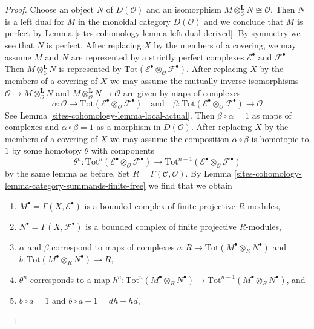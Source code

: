 \begin{proof}
\medskip\noindent
Choose an object $N$ of $D(\mathcal{O})$ and an isomorphism
$M \otimes_\mathcal{O}^\mathbf{L} N \cong \mathcal{O}$.
Then $N$ is a left dual for $M$ in the monoidal category
$D(\mathcal{O})$ and we conclude that $M$ is perfect by
Lemma \ref{sites-cohomology-lemma-left-dual-derived}. By symmetry we see that
$N$ is perfect. After replacing $X$ by the members of a covering,
we may assume $M$ and $N$ are represented by a strictly perfect
complexes $\mathcal{E}^\bullet$ and $\mathcal{F}^\bullet$.
Then $M \otimes_\mathcal{O}^\mathbf{L} N$ is represented by
$\text{Tot}(\mathcal{E}^\bullet \otimes_\mathcal{O} \mathcal{F}^\bullet)$.
After replacing $X$ by the members of a covering of $X$
we may assume the mutually inverse isomorphisms
$\mathcal{O} \to M \otimes_\mathcal{O}^\mathbf{L} N$ and
$M \otimes_\mathcal{O}^\mathbf{L} N \to \mathcal{O}$
are given by maps of complexes
$$
\alpha : \mathcal{O} \to
\text{Tot}(\mathcal{E}^\bullet \otimes_\mathcal{O} \mathcal{F}^\bullet)
\quad\text{and}\quad
\beta :
\text{Tot}(\mathcal{E}^\bullet \otimes_\mathcal{O} \mathcal{F}^\bullet)
\to \mathcal{O}
$$
See Lemma \ref{sites-cohomology-lemma-local-actual}. Then $\beta \circ \alpha = 1$
as maps of complexes and $\alpha \circ \beta = 1$ as a morphism
in $D(\mathcal{O})$. After replacing $X$ by the members of a covering
of $X$ we may assume the composition $\alpha \circ \beta$ is homotopic to $1$
by some homotopy $\theta$ with components
$$
\theta^n :
\text{Tot}^n(\mathcal{E}^\bullet \otimes_\mathcal{O} \mathcal{F}^\bullet)
\to
\text{Tot}^{n - 1}(
\mathcal{E}^\bullet \otimes_\mathcal{O} \mathcal{F}^\bullet)
$$
by the same lemma as before. Set $R = \Gamma(\mathcal{C}, \mathcal{O})$. By
Lemma \ref{sites-cohomology-lemma-category-summands-finite-free}
we find that we obtain
\begin{enumerate}
\item $M^\bullet = \Gamma(X, \mathcal{E}^\bullet)$
is a bounded complex of finite projective $R$-modules,
\item $N^\bullet = \Gamma(X, \mathcal{F}^\bullet)$
is a bounded complex of finite projective $R$-modules,
\item $\alpha$ and $\beta$ correspond to maps of complexes
$a : R \to \text{Tot}(M^\bullet \otimes_R N^\bullet)$ and
$b : \text{Tot}(M^\bullet \otimes_R N^\bullet) \to R$,
\item $\theta^n$ corresponds to a map
$h^n : \text{Tot}^n(M^\bullet \otimes_R N^\bullet) \to
\text{Tot}^{n - 1}(M^\bullet \otimes_R N^\bullet)$, and
\item $b \circ a = 1$ and $b \circ a - 1 = dh + hd$,

\end{enumerate}
\end{proof}
